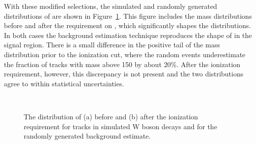 With these modified selections, the simulated and randomly generated distributions of \mdedx are shown in Figure~\ref{fig:closure_mass}. 
This figure includes the mass distributions before and after the requirement on \dedx, which significantly shapes the distributions.
In both cases the background estimation technique reproduces the shape of \mdedx in the signal region.
There is a small difference in the positive tail of the mass distribution prior to the ionization cut, where the random events underestimate the fraction of tracks with mass above 150 \GeV by about 20\%.
After the ionization requirement, however, this discrepancy is not present and the two distributions agree to within statistical uncertainties.

\begin{figure}[h]
\centering
{}
\\
\caption{The distribution of \mdedx (a) before and (b) after the ionization requirement for tracks in simulated W boson decays and for the randomly generated background estimate.}
\label{fig:closure_mass}
\end{figure}

